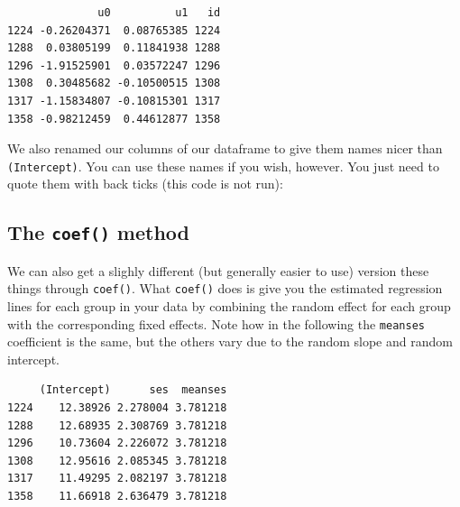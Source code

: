 \documentclass[
  letterpaper,
  DIV=11,
  numbers=noendperiod]{scrreprt}
\newenvironment{Shaded}{\begin{snugshade}}{\end{snugshade}}
\newcommand{\AttributeTok}[1]{\textcolor[rgb]{0.49,0.56,0.16}{#1}}
\newcommand{\FunctionTok}[1]{\textcolor[rgb]{0.02,0.16,0.49}{#1}}
\newcommand{\NormalTok}[1]{\textcolor[rgb]{0.00,0.44,0.13}{#1}}
\newcommand{\OtherTok}[1]{\textcolor[rgb]{0.00,0.44,0.13}{#1}}
\newcommand{\SpecialCharTok}[1]{\textcolor[rgb]{0.25,0.44,0.63}{#1}}
\newcommand{\StringTok}[1]{\textcolor[rgb]{0.25,0.44,0.63}{#1}}
\begin{document}
\begin{verbatim}
              u0          u1   id
1224 -0.26204371  0.08765385 1224
1288  0.03805199  0.11841938 1288
1296 -1.91525901  0.03572247 1296
1308  0.30485682 -0.10500515 1308
1317 -1.15834807 -0.10815301 1317
1358 -0.98212459  0.44612877 1358
\end{verbatim}

We also renamed our columns of our dataframe to give them names nicer
than \texttt{(Intercept)}. You can use these names if you wish, however.
You just need to quote them with back ticks (this code is not run):

\begin{Shaded}
\end{Shaded}

\hypertarget{the-coef-method}{%
\subsection{\texorpdfstring{The \texttt{coef()}
method}{The coef() method}}\label{the-coef-method}}

We can also get a slighly different (but generally easier to use)
version these things through \texttt{coef()}. What \texttt{coef()} does
is give you the estimated regression lines for each group in your data
by combining the random effect for each group with the corresponding
fixed effects. Note how in the following the \texttt{meanses}
coefficient is the same, but the others vary due to the random slope and
random intercept.

\begin{Shaded}
\end{Shaded}

\begin{verbatim}
     (Intercept)      ses  meanses
1224    12.38926 2.278004 3.781218
1288    12.68935 2.308769 3.781218
1296    10.73604 2.226072 3.781218
1308    12.95616 2.085345 3.781218
1317    11.49295 2.082197 3.781218
1358    11.66918 2.636479 3.781218
\end{verbatim}
\end{document}
